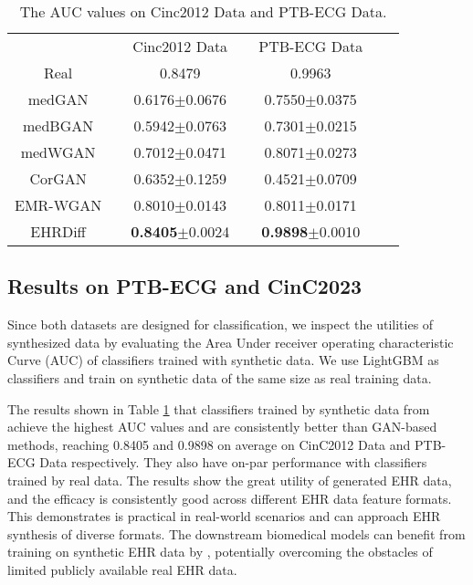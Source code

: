 \begin{table}[t]
\caption{The AUC values on Cinc2012 Data and PTB-ECG Data.}
\label{tab:discussion}
\begin{center}
\begin{tabular}{ccccccc}
\toprule
         &  & Cinc2012 Data                               &  & PTB-ECG Data&  \\
Real     && 0.8479 &&0.9963 &   \\ \hline
medGAN   && 0.6176$\pm$0.0676  && 0.7550$\pm$0.0375 &    \\
medBGAN  && 0.5942$\pm$0.0763   && 0.7301$\pm$0.0215  &  \\
medWGAN  && 0.7012$\pm$0.0471  && 0.8071$\pm$0.0273 &     \\
CorGAN   && 0.6352$\pm$0.1259   && 0.4521$\pm$0.0709 &    \\
EMR-WGAN && 0.8010$\pm$0.0143   && 0.8011$\pm$0.0171  &  \\
EHRDiff  && \textbf{0.8405}$\pm$0.0024 &&  \textbf{0.9898}$\pm$0.0010 &   \\ \toprule
\end{tabular}
\end{center}
\end{table}

\subsection{Results on PTB-ECG and CinC2023}

Since both datasets are designed for classification, we inspect the utilities of synthesized data by evaluating the Area Under receiver operating characteristic Curve (AUC) of classifiers trained with synthetic data. We use LightGBM \citep{ke2017lightgbm} as classifiers and train on synthetic data of the same size as real training data. 

The results shown in Table \ref{tab:discussion} that classifiers trained by synthetic data from \modelname achieve the highest AUC values and are consistently better than GAN-based methods, reaching 0.8405 and 0.9898 on average on CinC2012 Data and PTB-ECG Data respectively. They also have on-par performance with classifiers trained by real data. The results show the great utility of \modelname generated EHR data, and the efficacy is consistently good across different EHR data feature formats. This demonstrates \modelname is practical in real-world scenarios and can approach EHR synthesis of diverse formats. The downstream biomedical models can benefit from training on synthetic EHR data by \modelname, potentially overcoming the obstacles of limited publicly available real EHR data.


